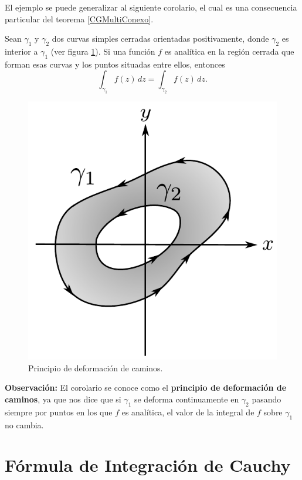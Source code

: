 El ejemplo se puede generalizar al siguiente corolario, el cual es una consecuencia particular del teorema \ref{CGMultiConexo}.

\begin{corolario} \label{CorolarioTCG}
Sean $\gamma_1$ y $\gamma_2$ dos curvas simples cerradas orientadas positivamente, donde $\gamma_2$ es interior a $\gamma_1$ (ver figura \ref{fig:CorlarioTCG}). Si una función $f$ es analítica en la región cerrada que forman esas curvas y los puntos situadas entre ellos, entonces
$$\int_{\gamma_1} f(z) \,dz = \int_{\gamma_2} f(z) \,dz.$$
\end{corolario}

\begin{figure}[H]
    \centering
    \includegraphics[scale = 0.6]{Figuras/CorolarioTCG.pdf}
    \caption{Principio de deformación de caminos.}
    \label{fig:CorlarioTCG}
\end{figure}

\textbf{Observación:} El corolario se conoce como el \textbf{principio de deformación de caminos}, ya que nos dice que si $\gamma_1$ se deforma continuamente en $\gamma_2$ pasando siempre por puntos en los que $f$ es analítica, el valor de la integral de $f$ sobre $\gamma_1$ no cambia.

\section{Fórmula de Integración de Cauchy}

